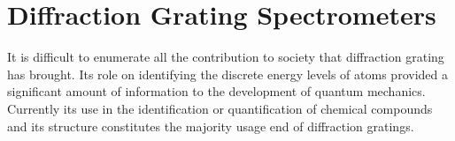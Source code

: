 \documentclass[12pt,twoside,english]{book}
\renewcommand{\~}{\perispomeni}%
\numberwithin{equation}{section}
\numberwithin{figure}{section}
\newcommand\fnurl[2]{%
 \href{#2}{#1}\footnote{\url{#2}}%
}
\begin{document}
%
%
%
%
%
%
%
\chapter{Diffraction Grating Spectrometers}
It is difficult to enumerate all the contribution to society that diffraction grating has brought. Its role on identifying the discrete energy levels of atoms provided a significant amount of information to the development of quantum mechanics. Currently its use in the identification or quantification of chemical compounds and its structure constitutes the majority usage end of diffraction gratings.


\end{document}
